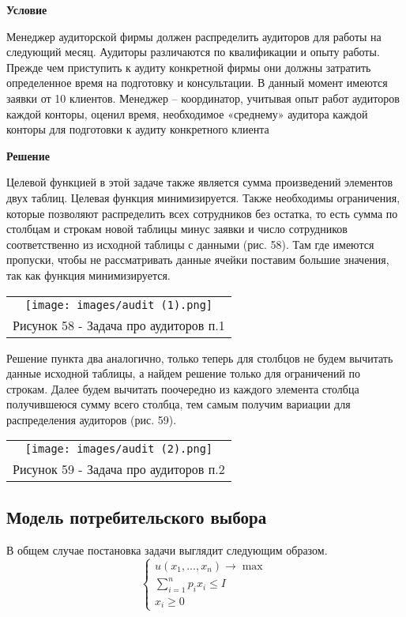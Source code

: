 \documentclass[12pt]{article}
\theoremstyle{definition}
\theoremstyle{remark}
\begin{document}
\textbf{Условие}

Менеджер аудиторской фирмы должен распределить
аудиторов для работы на следующий месяц. Аудиторы
различаются по квалификации и опыту работы. Прежде чем
приступить к аудиту конкретной фирмы они должны затратить
определенное время на подготовку и консультации. В данный
момент имеются заявки от 10 клиентов. Менеджер – координатор,
учитывая опыт работ аудиторов каждой конторы, оценил время,
необходимое «среднему» аудитора каждой конторы для подготовки
к аудиту конкретного клиента

\textbf{Решение}

Целевой функцией в этой задаче также является сумма произведений элементов двух таблиц. Целевая функция минимизируется. Также необходимы ограничения, которые позволяют распределить всех сотрудников без остатка, то есть сумма по столбцам и строкам новой таблицы минус заявки и число сотрудников соответственно из исходной таблицы с данными (рис. 58). Там где имеются пропуски, чтобы не рассматривать данные ячейки поставим большие значения, так как функция минимизируется.
\begin{center}
  \begin{tabular}{c}
\texttt{[image: images/audit (1).png]}\\
Рисунок 58 - Задача про аудиторов п.1
\end{tabular}
\end{center}

Решение пункта два аналогично, только теперь для столбцов не будем вычитать данные исходной таблицы, а найдем решение только для ограничений по строкам. Далее будем вычитать поочередно из каждого элемента столбца получившеюся сумму всего столбца, тем самым получим вариации для распределения аудиторов (рис. 59).
\begin{center}
  \begin{tabular}{c}
\texttt{[image: images/audit (2).png]}\\
Рисунок 59 - Задача про аудиторов п.2
\end{tabular}
\end{center}

\subsection{Модель потребительского выбора}
В общем случае постановка задачи выглядит следующим образом.
\begin{equation}
  \begin{cases}
u(x_1,...,x_n)\to\max\\
\sum_{i=1}^np_ix_i\leq I\\
x_i\geq 0
  \end{cases}
\end{equation}
\end{document}
